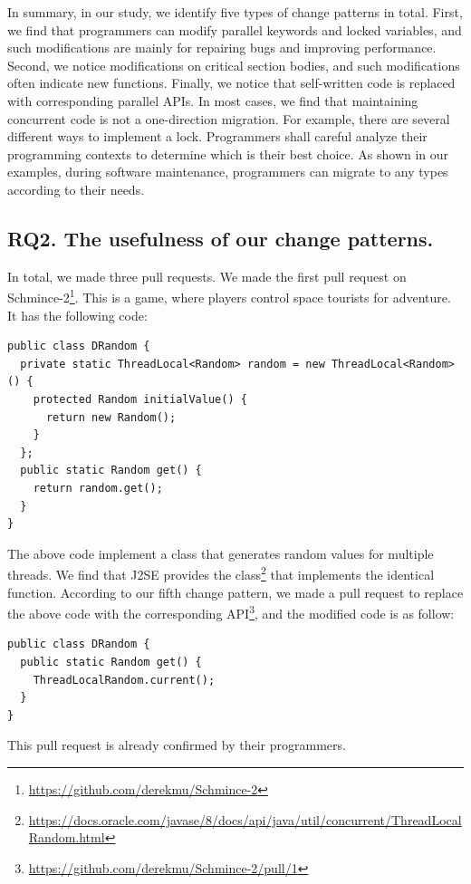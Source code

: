 In summary, in our study, we identify five types of change patterns in total. First, we find that programmers can modify parallel keywords and locked variables, and such modifications are mainly for repairing bugs and improving performance. Second, we notice modifications on critical section bodies, and such modifications often indicate new functions. Finally, we notice that self-written code is replaced with corresponding parallel APIs. In most cases, we find that maintaining concurrent code is not a one-direction migration. For example, there are several different ways to implement a lock. Programmers shall careful analyze their programming contexts to determine which is their best choice. As shown in our examples, during software maintenance, programmers can migrate to any types according to their needs.

\subsection{RQ2. The usefulness of our change patterns.}
\label{sec:result:sample}


In total, we made three pull requests. We made the first pull request on Schmince-2\footnote{\url{https://github.com/derekmu/Schmince-2}}. This is a game, where players control space tourists for adventure. It has the following code:

\begin{lstlisting}
public class DRandom {
  private static ThreadLocal<Random> random = new ThreadLocal<Random>() {
    protected Random initialValue() {
      return new Random();
    }
  };
  public static Random get() {
    return random.get();
  }
}
\end{lstlisting}

The above code implement a class that generates random values for multiple threads. We find that J2SE provides the  class\footnote{\url{https://docs.oracle.com/javase/8/docs/api/java/util/concurrent/ThreadLocalRandom.html}} that implements the identical function. According to our fifth change pattern, we made a pull request to replace the above code with the corresponding API\footnote{\url{https://github.com/derekmu/Schmince-2/pull/1}}, and the modified code is as follow:

\begin{lstlisting}
public class DRandom {
  public static Random get() {
    ThreadLocalRandom.current();
  }
}
\end{lstlisting}
This pull request is already confirmed by their programmers.

